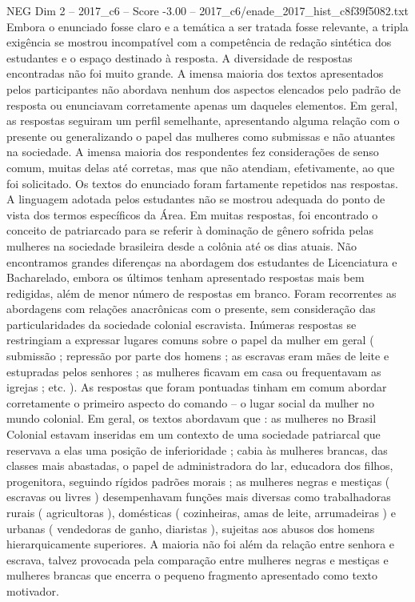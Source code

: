 \begin{textsample}{NEG Dim 2 – 2017\_c6 – Score -3.00 – 2017\_c6/enade\_2017\_hist\_c8f39f5082.txt}
Embora o enunciado fosse claro e a temática a ser tratada fosse relevante, a tripla exigência se mostrou incompatível com a competência de redação sintética dos estudantes e o espaço destinado à resposta.
A diversidade de respostas encontradas não foi muito grande.
A imensa maioria dos textos apresentados pelos participantes não abordava nenhum dos aspectos elencados pelo padrão de resposta ou enunciavam corretamente apenas um daqueles elementos.
Em geral, as respostas seguiram um perfil semelhante, apresentando alguma relação com o presente ou generalizando o papel das mulheres como submissas e não atuantes na sociedade.
A imensa maioria dos respondentes fez considerações de senso comum, muitas delas até corretas, mas que não atendiam, efetivamente, ao que foi solicitado.
Os textos do enunciado foram fartamente repetidos nas respostas.
A linguagem adotada pelos estudantes não se mostrou adequada do ponto de vista dos termos específicos da Área.
Em muitas respostas, foi encontrado o conceito de patriarcado para se referir à dominação de gênero sofrida pelas mulheres na sociedade brasileira desde a colônia até os dias atuais.
Não encontramos grandes diferenças na abordagem dos estudantes de Licenciatura e Bacharelado, embora os últimos tenham apresentado respostas mais bem redigidas, além de menor número de respostas em branco.
Foram recorrentes as abordagens com relações anacrônicas com o presente, sem consideração das particularidades da sociedade colonial escravista.
Inúmeras respostas se restringiam a expressar lugares comuns sobre o papel da mulher em geral ( submissão ; repressão por parte dos homens ; as escravas eram mães de leite e estupradas pelos senhores ; as mulheres ficavam em casa ou frequentavam as igrejas ; etc. ).
As respostas que foram pontuadas tinham em comum abordar corretamente o primeiro aspecto do comando – o lugar social da mulher no mundo colonial.
Em geral, os textos abordavam que : as mulheres no Brasil Colonial estavam inseridas em um contexto de uma sociedade patriarcal que reservava a elas uma posição de inferioridade ; cabia às mulheres brancas, das classes mais abastadas, o papel de administradora do lar, educadora dos filhos, progenitora, seguindo rígidos padrões morais ; as mulheres negras e mestiças ( escravas ou livres ) desempenhavam funções mais diversas como trabalhadoras rurais ( agricultoras ), domésticas ( cozinheiras, amas de leite, arrumadeiras ) e urbanas ( vendedoras de ganho, diaristas ), sujeitas aos abusos dos homens hierarquicamente superiores.
A maioria não foi além da relação entre senhora e escrava, talvez provocada pela comparação entre mulheres negras e mestiças e mulheres brancas que encerra o pequeno fragmento apresentado como texto motivador.

\end{textsample}

